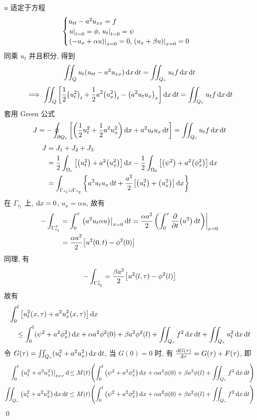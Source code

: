 \solution
$u$ 适定于方程
\[ \begin{cases}
u_{tt} - a^2 u_{xx} = f \\
{\left.{u} \right|}_{t=0} = \phi, {\left.{u_t} \right|}_{t=0} = \psi \\
{\left.{{\left( {-u_x + \alpha u} \right)}} \right|}_{x=0} = 0,
{\left.{{\left( {u_x + \beta u} \right)}} \right|}_{x=0} = 0
\end{cases} \]
同乘 $u_t$ 并且积分, 得到
\[
\iint_Q u_t (u_{tt} - a^2 u_{xx}) \operatorname{d\!} x \operatorname{d\!} t
= \iint_{Q_\tau} u_t f \operatorname{d\!} x \operatorname{d\!} t
\]
\[
\implies \iint_Q {\left[ {\frac{1}{2} {\left( {u_t^2} \right)}_t +
\frac{1}{2} a^2 {\left( {u_x^2} \right)}_t - {\left( {a^2 u_t u_x} \right)}_x } \right]} \operatorname{d\!} x \operatorname{d\!} t
= \iint_{Q_\tau} u_t f \operatorname{d\!} x \operatorname{d\!} t
\]
套用 Green 公式
\[
J = -\oint_{\partial Q_r} {\left[ {
	{\left( {\frac{1}{2} u_t^2 + \frac{1}{2} a^2 u_x^2} \right)} \operatorname{d\!} x
	+ a^2 u_t u_x \operatorname{d\!} t
} \right]} = \iint_{Q_r} u_t f \operatorname{d\!} x \operatorname{d\!} t
\]
\[ \begin{aligned}
J &= J_1 + J_2 + J_3 \\
&= \frac{1}{2} \int_{\Omega_r} {\left[ {
	{\left( {u_t^2} \right)} + a^2 {\left( {u_x^2} \right)}
} \right]} \operatorname{d\!} x - \frac{1}{2} \int_{\Omega_0} {\left[ {
	{\left( {\psi^2} \right)} + a^2 {\left( {\phi_x^2} \right)}
} \right]} \operatorname{d\!} x \\
&= \int_{\Gamma_{\tau_1} \cup \Gamma_{\tau_2}} {\left\{ {
	a^2 u_t u_x \operatorname{d\!} t + \frac{a^2}{2} {\left[ {
		{\left( {u_t^2} \right)} + {\left( {u_x^2} \right)}
	} \right]} \operatorname{d\!} x
} \right\}}
\end{aligned} \]
在 $\Gamma_{\tau_1}$ 上, $\operatorname{d\!} x = 0$, $u_x = \alpha u$, 故有
\[ \begin{aligned}
-\int_{\Gamma_{\tau_1}^{+}} &= \int_0^{\tau} {\left.{
	{\left( {a^2 u_t \alpha u} \right)}
} \right|}_{x=0} \operatorname{d\!} t = \frac{\alpha a^2}{2} {\left.{
	{\left( {\int_0^\tau {{\frac{\partial {}}{\partial {t}}}} {\left( {u^2} \right)} \operatorname{d\!} t} \right)}
} \right|}_{x=0} \\
&= \frac{\alpha a^2}{2} {\left[ {u^2(0, t) - \phi^2(0)} \right]}
\end{aligned} \]
同理, 有
\[
-\int_{\Gamma_{\tau_2}^{+}} =
\frac{\beta a^2}{2} {\left[ {u^2(l, \tau) - \phi^2(l)} \right]}
\]
故有
\[ \begin{aligned}
&\int_0^l {\left[ {u_t^2(x, \tau) + a^2 u_x^2(x, \tau)} \right]} \operatorname{d\!} x \\
&\quad \leq \int_0^l (\psi^2 + a^2 \phi_x^2) \operatorname{d\!} x + \alpha a^2 \phi^2(0)
 + \beta a^2 \phi^2(l) + \iint_{Q_\tau} f^2 \operatorname{d\!} x \operatorname{d\!} t
 + \iint_{Q_\tau} u_t^2 \operatorname{d\!} x \operatorname{d\!} t
\end{aligned} \]
令 $G(\tau) = \iint_{Q_\tau} (u_t^2 + a^2 u_x^2) \operatorname{d\!} x \operatorname{d\!} t$, 当 $G(0)=0$
时, 有 ${\frac{\operatorname{d\!} {G(\tau)}}{\operatorname{d\!} {\tau}}} = G(\tau) + F(\tau)$, 即
\[ \begin{aligned}
\int_0^l \mfwhen{\mclosure{u_t^2 + a^2 u_x^2}}{t=\tau} \diff \leq M(t)
\mclosure{
	\int_0^l \mclosure{\psi^2 + a^2 \phi_x^2} \diff x + \alpha a^2 \phi(0)
	+ \beta a^2 \phi(l) + \iint_{Q_\tau} f^2 \diff x \diff t
} \\
\iint_{Q_\tau} \mclosure{u_t^2 + a^2 u_x^2} \diff x \diff t \leq M(t)
\mclosure{
	\int_0^l \mclosure{\psi^2 + a^2 \phi_x^2} \diff x + \alpha a^2 \phi(0)
	+ \beta a^2 \phi(l) + \iint_{Q_\tau} f^2 \diff x \diff t
} \\
\end{aligned} \]
\qed
\endinput
